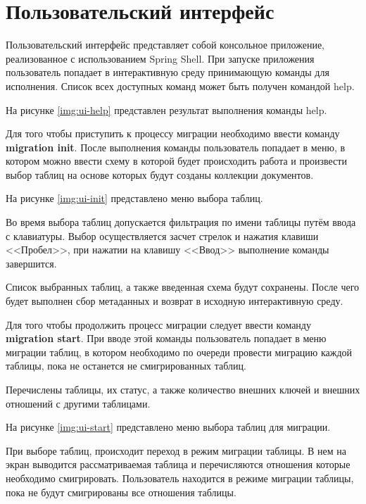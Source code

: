 \clearpage


\section{Пользовательский интерфейс}
Пользовательский интерфейс представляет собой консольное приложение, реализованное с использованием Spring Shell.
При запуске приложения пользователь попадает в интерактивную среду принимающую команды для исполнения.
Список всех доступных команд может быть получен командой \textmd{help}.

На рисунке \ref{img:ui-help} представлен результат выполнения команды \textmd{help}.

Для того чтобы приступить к процессу миграции необходимо ввести команду \textbf{migration init}. 
После выполнения команды пользователь попадает в меню, 
в котором можно ввести схему в которой будет происходить работа
и произвести выбор таблиц на основе которых будут созданы коллекции документов.

\clearpage

На рисунке \ref{img:ui-init} представлено меню выбора таблиц.

Во время выбора таблиц допускается фильтрация по имени таблицы путём ввода с клавиатуры.
Выбор осуществляется засчет стрелок и нажатия клавиши <<Пробел>>, 
при нажатии на клавишу <<Ввод>> выполнение команды завершится.

Список выбранных таблиц, а также введенная схема будут сохранены.
После чего будет выполнен сбор метаданных и возврат в исходную интерактивную среду.

Для того чтобы продолжить процесс миграции следует ввести команду \textbf{migration start}.
При вводе этой команды пользователь попадает в меню миграции таблиц, 
в котором необходимо по очереди провести миграцию каждой таблицы, 
пока не останется не смигрированных таблиц.

Перечислены таблицы, их статус, а также количество внешних ключей и внешних отношений с другими таблицами.

На рисунке \ref{img:ui-start} представлено меню выбора таблиц для миграции.

\clearpage

При выборе таблиц, происходит переход в режим миграции таблицы.
В нем на экран выводится рассматриваемая таблица и перечисляются отношения которые необходимо смигрировать.
Пользователь находится в режиме миграции таблицы, пока не будут смигрированы все отношения таблицы.

